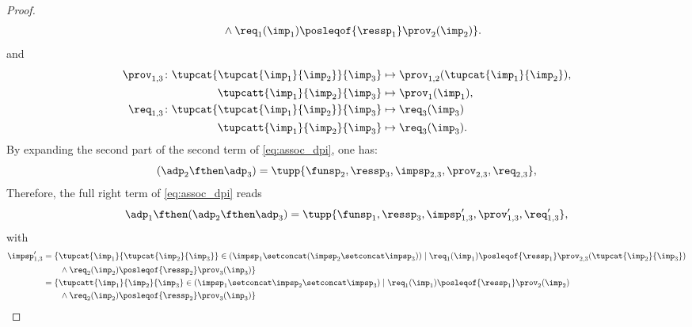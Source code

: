 \begin{proof}
\begin{equation}
\begin{aligned}
			             & \qquad \wedge \req_{1}(\imp_{1})\posleqof{\ressp_1}\prov_2(\imp_2)\}.
		\end{aligned}
	\end{equation}
	and
	\begin{equation}
		\begin{aligned}
			\prov_{1,3} \colon \tupcat {\tupcat {\imp_{1}} {\imp_{2}}} {\imp_{3}} & \mapsto\prov_{1,2}(\tupcat {\imp_{1}} {\imp_{2}}), \\
			\tupcatt{\imp_{1}}{\imp_{2}}{\imp_{3}}                                & \mapsto \prov_1(\imp_{1}),                         \\
			\req_{1,3} \colon \tupcat {\tupcat {\imp_{1}} {\imp_{2}}} {\imp_{3}}  & \mapsto\req_{3}(\imp_{3})                          \\
			\tupcatt{\imp_{1}}{\imp_{2}}{\imp_{3}}                                & \mapsto\req_{3}(\imp_{3}).
		\end{aligned}
	\end{equation}
	By expanding the second part of the second term of \cref{eq:assoc_dpi}, one has:
	\begin{equation}
		(\adp_{2} \fthen \adp_{3})
		=
		\tupp{ \funsp_{2},\ressp_{3},\impsp_{2,3},\prov_{2,3},\req_{2,3}},
	\end{equation}
	Therefore, the full right term of \cref{eq:assoc_dpi} reads
	\begin{equation}
		\label{eq:dpi_ass_2}
		\adp_{1} \fthen (\adp_{2}\fthen \adp_{3})=\tupp{ \funsp_{1},\ressp_{3},\impsp'_{1,3},\prov'_{1,3},\req'_{1,3}},
	\end{equation}
	with
	\begin{equation}
		\begin{aligned}
			\impsp_{1,3}' & =  \{  \tupcat {\imp_{1}} {\tupcat {\imp_{2}} {\imp_{3}}} \in (\impsp_{1} \setconcat (\impsp_{2}\setconcat \impsp_{3}))\mid\req_{1}(\imp_{1})\posleqof{\ressp_{1}}\prov_{2,3}(\tupcat {\imp_{2}} {\imp_{3}}) \\
			              & \qquad \wedge \req_2(\imp_2)\posleqof{\ressp_2}\prov_3(\imp_3)\}                                                                                                                                             \\
			              & =\{  \tupcatt{\imp_{1}}{\imp_{2}}{\imp_{3}} \in (\impsp_{1} \setconcat \impsp_{2}\setconcat \impsp_{3})\mid\req_{1}(\imp_{1})\posleqof{\ressp_{1}}\prov_{2}(\imp_2)                                          \\
			              & \qquad \wedge \req_2(\imp_2)\posleqof{\ressp_2}\prov_3(\imp_3)\}                                                                                                                                             \\

\end{aligned}
\end{equation}
\end{proof}
